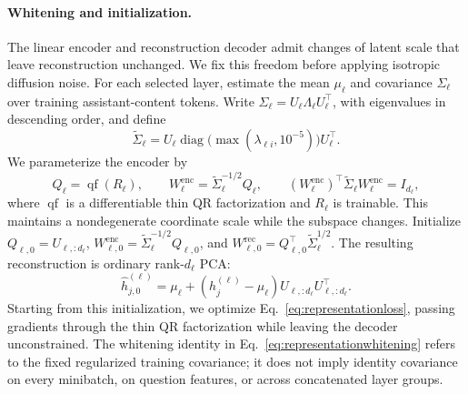 \documentclass[11pt,letterpaper]{article}
\begin{document}
\paragraph{Whitening and initialization.}
The linear encoder and reconstruction decoder admit changes of latent scale that leave reconstruction unchanged. We fix this freedom before applying isotropic diffusion noise. For each selected layer, estimate the mean $\mu_\ell$ and covariance $\Sigma_\ell$ over training assistant-content tokens. Write $\Sigma_\ell=U_\ell\Lambda_\ell U_\ell^\top$, with eigenvalues in descending order, and define
\[
 \widetilde\Sigma_\ell=U_\ell\operatorname{diag}\!\big(\max(\lambda_{\ell i},10^{-5})\big)U_\ell^\top.
\]
We parameterize the encoder by
\begin{equation}
 Q_\ell=\operatorname{qf}(R_\ell),\qquad
 W_\ell^{\mathrm{enc}}=\widetilde\Sigma_\ell^{-1/2}Q_\ell,\qquad
 (W_\ell^{\mathrm{enc}})^\top\widetilde\Sigma_\ell W_\ell^{\mathrm{enc}}=I_{d_\ell},
 \label{eq:representationwhitening}
\end{equation}
where $\operatorname{qf}$ is a differentiable thin QR factorization and $R_\ell$ is trainable. This maintains a nondegenerate coordinate scale while the subspace changes.
Initialize $Q_{\ell,0}=U_{\ell,:d_\ell}$, $W_{\ell,0}^{\mathrm{enc}}=\widetilde\Sigma_\ell^{-1/2}Q_{\ell,0}$, and $W_{\ell,0}^{\mathrm{rec}}=Q_{\ell,0}^\top\widetilde\Sigma_\ell^{1/2}$. The resulting reconstruction is ordinary rank-$d_\ell$ PCA:
\[
 \widehat h_{j,0}^{(\ell)}=\mu_\ell+(h_j^{(\ell)}-\mu_\ell)U_{\ell,:d_\ell}U_{\ell,:d_\ell}^\top.
\]
Starting from this initialization, we optimize Eq.~\eqref{eq:representationloss}, passing gradients through the thin QR factorization while leaving the decoder unconstrained. The whitening identity in Eq.~\eqref{eq:representationwhitening} refers to the fixed regularized training covariance; it does not imply identity covariance on every minibatch, on question features, or across concatenated layer groups.
\end{document}
